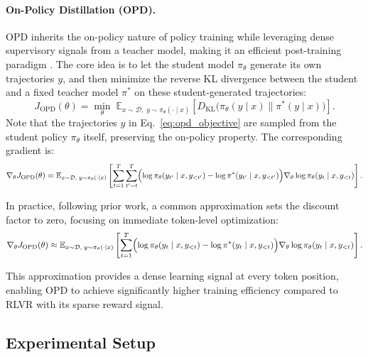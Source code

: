 \documentclass{llmxive}
\begin{document}
\paragraph{On-Policy Distillation (OPD).}
OPD inherits the on-policy nature of policy training while leveraging dense supervisory signals from a teacher model, making it an efficient post-training paradigm \citep{Yang2026LearningBT}. The core idea is to let the student model $\pi_{\theta}$ generate its own trajectories $y$, and then minimize the reverse KL divergence between the student and a fixed teacher model $\pi^*$ on these student-generated trajectories:
\begin{equation}
J_{\text{OPD}}(\theta) = \min_{\theta} \; \mathbb{E}_{x \sim \mathcal{D}, \; y \sim \pi_{\theta}(\cdot \mid x)} \left[ D_{\text{KL}}\bigl(\pi_{\theta}(y \mid x) \parallel \pi^*(y \mid x)\bigr) \right].
\label{eq:opd_objective}
\end{equation}
Note that the trajectories $y$ in Eq.~\eqref{eq:opd_objective} are sampled from the student policy $\pi_{\theta}$ itself, preserving the on-policy property. The corresponding gradient is:
\begin{equation}
\nabla_{\theta} J_{\text{OPD}}(\theta) = \mathbb{E}_{x \sim \mathcal{D}, \; y \sim \pi_{\theta}(\cdot \mid x)} \left[ \sum_{t=1}^{T} \sum_{t'=t}^{T} \Bigl( \log \pi_{\theta}(y_{t'} \mid x, y_{<t'}) - \log \pi^*(y_{t'} \mid x, y_{<t'}) \Bigr) \nabla_{\theta} \log \pi_{\theta}(y_t \mid x, y_{<t}) \right].
\label{eq:opd_gradient_full}
\end{equation}

In practice, following prior work, a common approximation sets the discount factor to zero, focusing on immediate token-level optimization:
\begin{equation}
\nabla_{\theta} J_{\text{OPD}}(\theta) \approx \mathbb{E}_{x \sim \mathcal{D}, \; y \sim \pi_{\theta}(\cdot \mid x)} \left[ \sum_{t=1}^{T} \Bigl( \log \pi_{\theta}(y_t \mid x, y_{<t}) - \log \pi^*(y_t \mid x, y_{<t}) \Bigr) \nabla_{\theta} \log \pi_{\theta}(y_t \mid x, y_{<t}) \right].
\label{eq:opd_gradient_approx}
\end{equation}

This approximation provides a dense learning signal at every token position, enabling OPD to achieve significantly higher training efficiency compared to RLVR with its sparse reward signal.


\subsection{Experimental Setup}
\label{Experimental Setup}
\end{document}
